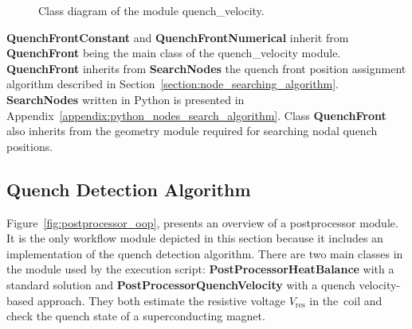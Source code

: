 \begin{figure}[H]
    \caption{Class diagram of the module quench\_velocity.}
    \label{fig:quench_velocity_oop}
\end{figure}

\textbf{QuenchFrontConstant} and \textbf{QuenchFrontNumerical} inherit from \textbf{QuenchFront} being the main class of the quench\_velocity module. \textbf{QuenchFront} inherits from \textbf{SearchNodes} the quench front position assignment algorithm described in Section~\ref{section:node_searching_algorithm}. \textbf{SearchNodes} written in Python is presented in Appendix~\ref{appendix:python_nodes_search_algorithm}. Class \textbf{QuenchFront} also inherits from the geometry module required for searching nodal quench positions.  

\subsection{Quench Detection Algorithm}

Figure~\ref{fig:postprocessor_oop}, presents an overview of a postprocessor module. It is the only workflow module depicted in this section because it includes an implementation of the quench detection algorithm. There are two main classes in the module used by the execution script: \textbf{PostProcessorHeatBalance} with a standard solution and \textbf{PostProcessorQuenchVelocity} with a quench velocity-based approach. They both estimate the resistive voltage $V_\text{res}$ in the~coil and check the quench state of a superconducting magnet. 

